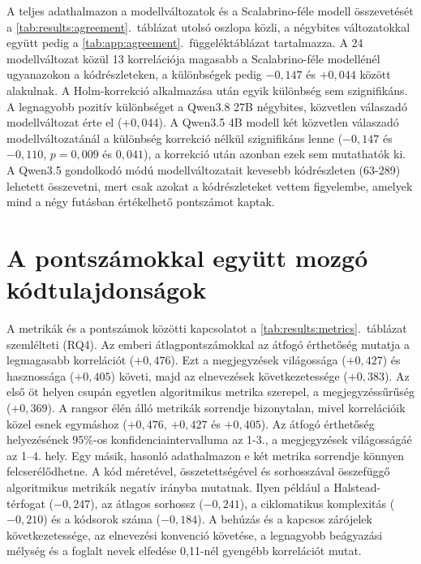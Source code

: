 \documentclass[
]{elteikthesis}[2024/04/26]
\begin{document}
A teljes adathalmazon a modellváltozatok és a Scalabrino-féle modell
összevetését a \ref{tab:results:agreement}.~táblázat utolsó oszlopa közli, a
négybites változatokkal együtt pedig a \ref{tab:app:agreement}.~függeléktáblázat
tartalmazza. A 24 modellváltozat közül 13 korrelációja magasabb a
Scalabrino-féle modellénél ugyanazokon a kódrészleteken, a különbségek pedig
$-0{,}147$ és $+0{,}044$ között alakulnak. A Holm-korrekció alkalmazása után
egyik különbség sem szignifikáns. A legnagyobb pozitív különbséget a Qwen3.8 27B
négybites, közvetlen válaszadó modellváltozat érte el ($+0{,}044$). A Qwen3.5 4B
modell két közvetlen válaszadó modellváltozatánál a különbség korrekció nélkül
szignifikáns lenne ($-0{,}147$ és $-0{,}110$, $p = 0{,}009$ és $0{,}041$), a
korrekció után azonban ezek sem mutathatók ki. A Qwen3.5 gondolkodó módú
modellváltozatait kevesebb kódrészleten (63-289) lehetett összevetni, mert csak
azokat a kódrészleteket vettem figyelembe, amelyek mind a négy futásban
értékelhető pontszámot kaptak.

\section{A pontszámokkal együtt mozgó kódtulajdonságok} %
\label{sec:results:metrics}

A metrikák és a pontszámok közötti kapcsolatot a
\ref{tab:results:metrics}.~táblázat szemlélteti (RQ4). Az emberi
átlagpontszámokkal az átfogó érthetőség mutatja a legmagasabb korrelációt
($+0{,}476$). Ezt a megjegyzések világossága ($+0{,}427$) és hasznossága
($+0{,}405$) követi, majd az elnevezések következetessége ($+0{,}383$). Az első
öt helyen csupán egyetlen algoritmikus metrika szerepel, a megjegyzéssűrűség
($+0{,}369$). A rangsor élén álló metrikák sorrendje bizonytalan, mivel
korrelációik közel esnek egymáshoz ($+0{,}476$, $+0{,}427$ és $+0{,}405$). Az
átfogó érthetőség helyezésének 95\%-os konfidenciaintervalluma az 1-3., a
megjegyzések világosságáé az 1--4. hely. Egy másik, hasonló adathalmazon e két
metrika sorrendje könnyen felcserélődhetne. A kód méretével, összetettségével és
sorhosszával összefüggő algoritmikus metrikák negatív irányba mutatnak. Ilyen
például a Halstead-térfogat ($-0{,}247$), az átlagos sorhossz ($-0{,}241$), a
ciklomatikus komplexitás ($-0{,}210$) és a kódsorok száma ($-0{,}184$). A
behúzás és a kapcsos zárójelek következetessége, az elnevezési konvenció
követése, a legnagyobb beágyazási mélység és a foglalt nevek elfedése 0,11-nél
gyengébb korrelációt mutat.
\end{document}
